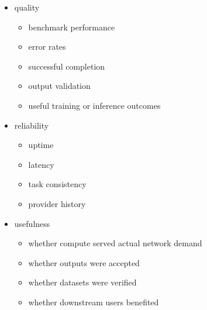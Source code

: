 ﻿\documentclass[12pt]{article}
\begin{document}
\begin{itemize}
  \item quality
\begin{itemize}
  \item benchmark performance
\end{itemize}
\begin{itemize}
  \item error rates
\end{itemize}
\begin{itemize}
  \item successful completion
\end{itemize}
\begin{itemize}
  \item output validation
\end{itemize}
\begin{itemize}
  \item useful training or inference outcomes
\end{itemize}
\end{itemize}

\begin{itemize}
  \item reliability
\begin{itemize}
  \item uptime
\end{itemize}
\begin{itemize}
  \item latency
\end{itemize}
\begin{itemize}
  \item task consistency
\end{itemize}
\begin{itemize}
  \item provider history
\end{itemize}
\end{itemize}

\begin{itemize}
  \item usefulness
\begin{itemize}
  \item whether compute served actual network demand
\end{itemize}
\begin{itemize}
  \item whether outputs were accepted
\end{itemize}
\begin{itemize}
  \item whether datasets were verified
\end{itemize}
\begin{itemize}
  \item whether downstream users benefited
\end{itemize}
\end{itemize}
\end{document}
